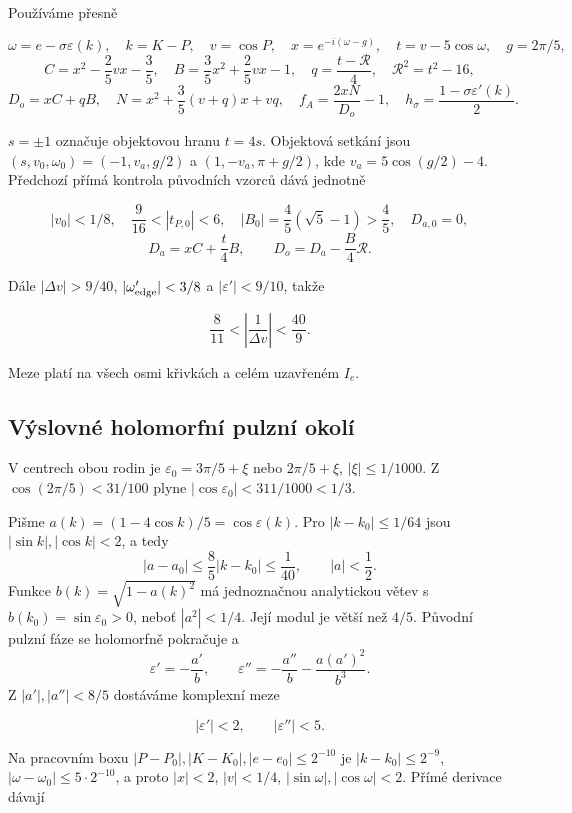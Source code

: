 \documentclass[11pt,a4paper]{article}
\theoremstyle{remark}\newtheorem{remark}[theorem]{Poznámka}
\numberwithin{equation}{section}
\begin{document}
Používáme přesně

\[
\omega=e-\sigma\varepsilon(k),\quad k=K-P,\quad v=\cos P,\quad
x=e^{-i(\omega-g)},\quad t=v-5\cos\omega,\quad g=2\pi/5,
\] \[
C=x^2-\frac25vx-\frac35,\quad
B=\frac35x^2+\frac25vx-1,\quad
q=\frac{t-\mathcal R}{4},\quad \mathcal R^2=t^2-16,
\] \[
D_o=xC+qB,\quad N=x^2+\frac35(v+q)x+vq,\quad
f_A=\frac{2xN}{D_o}-1,\quad h_\sigma=\frac{1-\sigma\varepsilon'(k)}2.
\tag{QA5}
\]

\(s=\pm1\) označuje objektovou hranu \(t=4s\). Objektová setkání jsou
\((s,v_0,\omega_0)=(-1,v_a,g/2)\) a \((1,-v_a,\pi+g/2)\), kde
\(v_a=5\cos(g/2)-4\). Předchozí přímá kontrola původních vzorců dává
jednotně

\[
|v_0|<1/8,\quad \frac9{16}<|t_{P,0}|<6,\quad
|B_0|=\frac45(\sqrt5-1)>\frac45,\quad D_{a,0}=0,
\tag{QA6}
\] \[
D_a=xC+\frac t4B,\qquad D_o=D_a-\frac B4\mathcal R.
\]

Dále \(|\Delta v|>9/40\), \(|\omega_{\rm edge}'|<3/8\) a
\(|\varepsilon'|<9/10\), takže

\[
\frac8{11}<\left|\frac1{\Delta v}\right|<\frac{40}{9}.
\tag{QA7}
\]

Meze platí na všech osmi křivkách a celém uzavřeném \(I_e\).

\hypertarget{vuxfdslovnuxe9-holomorfnuxed-pulznuxed-okoluxed}{%
\subsection{Výslovné holomorfní pulzní
okolí}\label{vuxfdslovnuxe9-holomorfnuxed-pulznuxed-okoluxed}}

V centrech obou rodin je \(\varepsilon_0=3\pi/5+\xi\) nebo
\(2\pi/5+\xi\), \(|\xi|\le1/1000\). Z \(\cos(2\pi/5)<31/100\) plyne
\(|\cos\varepsilon_0|<311/1000<1/3\).

Pišme \(a(k)=(1-4\cos k)/5=\cos\varepsilon(k)\). Pro \(|k-k_0|\le1/64\)
jsou \(|\sin k|,|\cos k|<2\), a tedy \[
|a-a_0|\le\frac85|k-k_0|\le\frac1{40},\qquad |a|<\frac12.
\] Funkce \(b(k)=\sqrt{1-a(k)^2}\) má jednoznačnou analytickou větev s
\(b(k_0)=\sin\varepsilon_0>0\), neboť \(|a^2|<1/4\). Její modul je větší
než \(4/5\). Původní pulzní fáze se holomorfně pokračuje a \[
\varepsilon'=-\frac{a'}b,\qquad
\varepsilon''=-\frac{a''}b-\frac{a(a')^2}{b^3}.
\] Z \(|a'|,|a''|<8/5\) dostáváme komplexní meze

\[
\boxed{|\varepsilon'|<2,\qquad |\varepsilon''|<5.}
\tag{QA8}
\]

Na pracovním boxu \(|P-P_0|,|K-K_0|,|e-e_0|\le2^{-10}\) je
\(|k-k_0|\le2^{-9}\), \(|\omega-\omega_0|\le5\cdot2^{-10}\), a proto
\(|x|<2\), \(|v|<1/4\), \(|\sin\omega|,|\cos\omega|<2\). Přímé derivace
dávají
\end{document}
